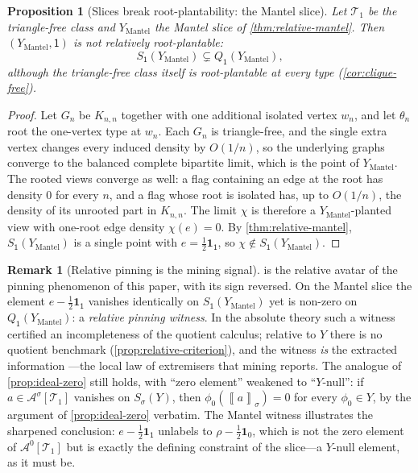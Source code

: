 \documentclass[11pt]{article}
\newtheorem{proposition}[proposition]{Proposition}
\theoremstyle{definition}
\newtheorem{remark}[remark]{Remark}
\newcommand{\A}{\mathcal{A}}
\newcommand{\T}{\mathcal{T}}
\newcommand{\avg}[2]{\left\llbracket #1 \right\rrbracket_{#2}}
\newcommand{\one}{\mathbf 1}
\newcommand{\vtype}{\mathsf{1}}
\begin{document}
\begin{proposition}[Slices break root-plantability: the Mantel slice]\label{prop:mantel-not-plantable}
Let $\T_1$ be the triangle-free class and $Y_{\mathrm{Mantel}}$ the Mantel slice of
\cref{thm:relative-mantel}.  Then $(Y_{\mathrm{Mantel}},\vtype)$ is not relatively
root-plantable:
\[
  S_{\vtype}(Y_{\mathrm{Mantel}})\subsetneq Q_{\vtype}(Y_{\mathrm{Mantel}}),
\]
although the triangle-free class itself is root-plantable at every type
(\cref{cor:clique-free}).
\end{proposition}

\begin{proof}
Let $G_n$ be $K_{n,n}$ together with one additional isolated vertex $w_n$, and let
$\theta_n$ root the one-vertex type at $w_n$.  Each $G_n$ is triangle-free, and the
single extra vertex changes every induced density by $O(1/n)$, so the underlying graphs
converge to the balanced complete bipartite limit, which is the point of
$Y_{\mathrm{Mantel}}$.  The rooted views converge as well: a flag containing an edge at
the root has density $0$ for every $n$, and a flag whose root is isolated has, up to
$O(1/n)$, the density of its unrooted part in $K_{n,n}$.  The limit $\chi$ is therefore
a $Y_{\mathrm{Mantel}}$-planted view with one-root edge density $\chi(e)=0$.  By
\cref{thm:relative-mantel}, $S_{\vtype}(Y_{\mathrm{Mantel}})$ is a single point with
$e=\frac12\one_{\vtype}$, so $\chi\notin S_{\vtype}(Y_{\mathrm{Mantel}})$.
\end{proof}

\begin{remark}[Relative pinning is the mining signal]\label{rem:relative-pinning}
 is the relative avatar of the pinning phenomenon of
this paper, with its sign reversed.  On the Mantel slice the element
$e-\frac12\one_{\vtype}$ vanishes identically on $S_{\vtype}(Y_{\mathrm{Mantel}})$ yet is
non-zero on $Q_{\vtype}(Y_{\mathrm{Mantel}})$: a \emph{relative pinning witness}.  In
the absolute theory such a witness certified an incompleteness of the quotient
calculus; relative to $Y$ there is no quotient benchmark
(\cref{prop:relative-criterion}), and the witness \emph{is} the extracted information
---the local law of extremisers that mining reports.  The analogue of
\cref{prop:ideal-zero} still holds, with ``zero element'' weakened to ``$Y$-null'': if
$a\in\A^\sigma[\T_1]$ vanishes on $S_\sigma(Y)$, then $\phi_0(\avg{a}{\sigma})=0$ for
every $\phi_0\in Y$, by the argument of \cref{prop:ideal-zero} verbatim.  The Mantel
witness illustrates the sharpened conclusion: $e-\frac12\one_{\vtype}$ unlabels to
$\rho-\frac12\one_0$, which is not the zero element of $\A^0[\T_1]$ but is exactly the
defining constraint of the slice---a $Y$-null element, as it must be.
\end{remark}
\end{document}
